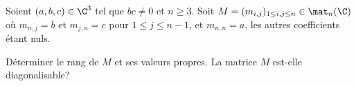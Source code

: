 \begin{enonce}
\begin{exercise}[ID={RMS125 E955, CCP MP},subtitle={2014 CCP MP},tags={}]
Soient $(a,b,c)\in\C^3$ tel que $bc\neq0$ et $n\geq3$.
Soit $M=(m_{i,j})_{1\leq i,j\leq n}\in\mat_n(\C)$
où $m_{n,j}=b$ et $m_{j,n}=c$ pour $1\leq j \leq n-1$, et $m_{n,n}=a$,
les autres coefficients étant nuls.

Déterminer le rang de $M$ et ses valeurs propres.
La matrice $M$ est-elle diagonalisable?
\end{exercise}
\begin{solution}
\end{solution}
\end{enonce}
